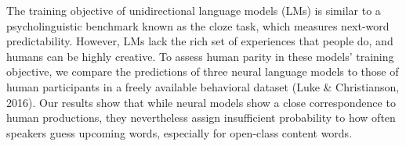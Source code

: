 The training objective of unidirectional language models (LMs) is similar to a psycholinguistic benchmark known as the cloze task, which measures next-word predictability. However, LMs lack the rich set of experiences that people do, and humans can be highly creative. To assess human parity in these models' training objective, we compare the predictions of three neural language models to those of human participants in a freely available behavioral dataset (Luke \& Christianson, 2016). Our results show that while neural models show a close correspondence to human productions, they nevertheless assign insufficient probability to how often speakers guess upcoming words, especially for open-class content words.
